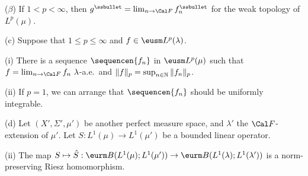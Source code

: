 \qquad($\beta$) If $1<p<\infty$, then
$g^{\ssbullet}=\lim_{n\to\Cal F}f_n^{\ssbullet}$ for the weak topology of
$L^p(\mu)$.


(c) Suppose that $1\le p\le\infty$ and $f\in\eusm L^p(\lambda)$.

\quad(i) There is a
sequence $\sequencen{f_n}$ in $\eusm L^p(\mu)$ such that
$f=\lim_{n\to\Cal F}f_n\,\,\lambda$-a.e.\
and $\|f\|_p=\sup_{n\in\Bbb N}\|f_n\|_p$.

\quad(ii) If $p=1$, we can arrange that $\sequencen{f_n}$ should
be uniformly integrable.

(d) Let $(X',\Sigma',\mu')$ be another perfect measure space, and
$\lambda'$ the $\Cal F$-extension of $\mu'$.
Let $S:L^1(\mu)\to L^1(\mu')$ be a bounded linear operator.


\quad(ii) The map
$S\mapsto\hat S:\eurm B(L^1(\mu);L^1(\mu'))
\to\eurm B(L^1(\lambda);L^1(\lambda'))$
is a norm-preserving Riesz homomorphism.


